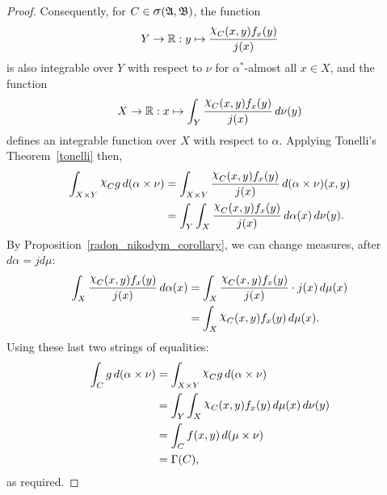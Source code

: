 \documentclass[
twoside=true,
paper=letter,
fontsize=11pt,
pagesize=auto,
leqno,
openany,
headsepline,
overfullrule,
]{scrbook}
\theoremstyle{plain}
\theoremstyle{plain}
\theoremstyle{definition}
\theoremstyle{bfnoteitalic}
\theoremstyle{bfnoteroman}
\newcommand{\sigalg}[1]{\mathfrak{#1}}
\newcommand{\sagb}{\mathop{\hbox{\large{$\sigma$}}}\nolimits}
\newcommand{\charfunction}[1]{{\raisebox{2pt}{$\chi$}}_{#1}}
\newcommand{\R}{\mathbb{R}}
\newcommand{\sigmaalgebra}{\sigalg{A}}
\newcommand{\sigmaalgebraii}{\sigalg{B}}
\newcommand{\productsig}[2]{\sagb(#1,#2)}
\newcommand{\funcj}{j}
\newcommand{\function}{f}
\newcommand{\functionii}{g}
\newcommand{\measurespace}{X}
\newcommand{\measurespaceii}{Y}
\newcommand{\mspaceelt}{x}
\newcommand{\mspaceeltii}{y}
\newcommand{\measure}{\mu}
\newcommand{\measureii}{\nu}
\newcommand{\setiii}{C}
\newcommand{\measonprod}{\Gamma}%
\newcommand{\marginalone}{\alpha}%
\begin{document}
\begin{proof}
Consequently, for $\setiii\in\productsig{\sigmaalgebra}{\sigmaalgebraii}$, 
the function
\[
\measurespaceii\to\R :
\mspaceeltii \mapsto
\frac{\charfunction{\setiii}(\mspaceelt,\mspaceeltii)
\function_\mspaceelt(\mspaceeltii)}
{\funcj(\mspaceelt)}
\]
is also integrable over $\measurespaceii$ with respect to $\measureii$ for 
$\marginalone^*$-almost all $\mspaceelt\in\measurespace$,
and the function
\[
\measurespace\to\R :
\mspaceelt \mapsto 
\int_\measurespaceii 
\frac{
\charfunction{\setiii}(\mspaceelt,\mspaceeltii) 
\function_\mspaceelt(\mspaceeltii)}{\funcj(\mspaceelt)} 
\, d\measureii(\mspaceeltii)
\]
defines an integrable function over $\measurespace$ with respect to 
$\marginalone$.
Applying Tonelli's Theorem~\ref{tonelli} then,
\begin{align*}
\int_{\measurespace\times\measurespaceii}
\charfunction{\setiii}
\functionii
\, d(\marginalone\times\measureii)
& =
\int_{\measurespace\times\measurespaceii}
\frac{
\charfunction{\setiii}(\mspaceelt,\mspaceeltii) 
\function_\mspaceelt(\mspaceeltii)}
{\funcj(\mspaceelt)} 
\, d(\marginalone\times\measureii)(\mspaceelt,\mspaceeltii)
\\
& =
\int_\measurespaceii
\int_\measurespace 
\frac{
\charfunction{\setiii}(\mspaceelt,\mspaceeltii) 
\function_\mspaceelt(\mspaceeltii)}{\funcj(\mspaceelt)} 
\, d\marginalone(\mspaceelt)
\, d\measureii(\mspaceeltii).
\end{align*}
By Proposition~\ref{radon_nikodym_corollary}, we can change measures, after
$d\marginalone = \funcj d\measure$:
\begin{align*}
\int_\measurespace 
\frac{
\charfunction{\setiii}(\mspaceelt,\mspaceeltii) 
\function_\mspaceelt(\mspaceeltii)}{\funcj(\mspaceelt)} 
\, d\marginalone(\mspaceelt)
& =
\int_\measurespace 
\frac{
\charfunction{\setiii}(\mspaceelt,\mspaceeltii) 
\function_\mspaceelt(\mspaceeltii)}{\funcj(\mspaceelt)} 
\cdot \funcj(\mspaceelt)
\, d\measure(\mspaceelt)
\\
& =
\int_\measurespace 
\charfunction{\setiii}(\mspaceelt,\mspaceeltii) 
\function_\mspaceelt(\mspaceeltii)
\, d\measure(\mspaceelt).
\end{align*}
Using these last two strings of equalities:
\begin{align*}
\int_\setiii \functionii
\,d(\marginalone\times\measureii)
& = 
\int_{\measurespace\times\measurespaceii}
\charfunction{\setiii}
\functionii
\, d(\marginalone\times\measureii)
\\
& =
\int_\measurespaceii
\int_\measurespace 
\charfunction{\setiii}(\mspaceelt,\mspaceeltii) 
\function_\mspaceelt(\mspaceeltii)
\, d\measure(\mspaceelt)
\, d\measureii(\mspaceeltii)
\\
& =
\int_{\setiii} 
\function(\mspaceelt,\mspaceeltii)
\, d(\measure\times\measureii)
\\
& =
\measonprod(\setiii),
\end{align*}
as required.


\end{proof}
\end{document}
